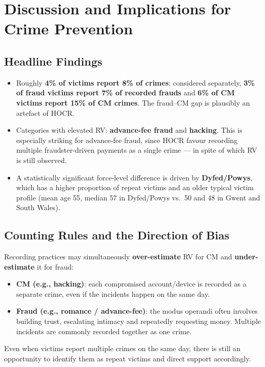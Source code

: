 \documentclass[11pt,a4paper,openany]{report}
\theoremstyle{definition}
\theoremstyle{plain}
\theoremstyle{remark}
\begin{document}
\section{Discussion and Implications for Crime Prevention}

\subsection{Headline Findings}

\begin{itemize}
    \item Roughly \textbf{4\% of victims report 8\% of crimes}; considered separately, \textbf{3\% of fraud victims report 7\% of recorded frauds} and \textbf{6\% of CM victims report 15\% of CM crimes}. The fraud--CM gap is plausibly an artefact of HOCR.
    \item Categories with elevated RV: \textbf{advance-fee fraud} and \textbf{hacking}. This is especially striking for advance-fee fraud, since HOCR favour recording multiple fraudster-driven payments as a single crime --- in spite of which RV is still observed.
    \item A statistically significant force-level difference is driven by \textbf{Dyfed/Powys}, which has a higher proportion of repeat victims and an older typical victim profile (mean age 55, median 57 in Dyfed/Powys vs.\ 50 and 48 in Gwent and South Wales).
\end{itemize}

\subsection{Counting Rules and the Direction of Bias}

Recording practices may simultaneously \textbf{over-estimate} RV for CM and \textbf{under-estimate} it for fraud:

\begin{itemize}
    \item \textbf{CM (e.g., hacking)}: each compromised account/device is recorded as a separate crime, even if the incidents happen on the same day.
    \item \textbf{Fraud (e.g., romance / advance-fee)}: the modus operandi often involves building trust, escalating intimacy and repeatedly requesting money. Multiple incidents are commonly recorded together as one crime.
\end{itemize}

Even when victims report multiple crimes on the same day, there is still an opportunity to identify them as repeat victims and direct support accordingly.
\end{document}
